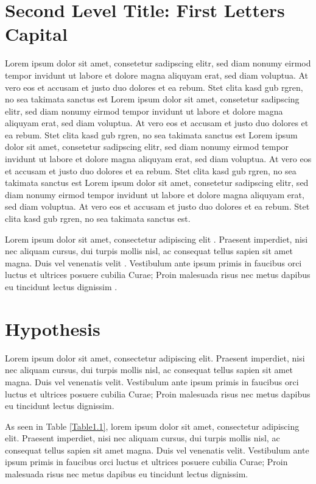 \section{Second Level Title: First Letters Capital}\label{literaturereview}

Lorem ipsum dolor sit amet, consetetur sadipscing elitr, sed diam nonumy eirmod tempor invidunt ut labore et dolore magna aliquyam erat, sed diam voluptua. At vero eos et accusam et justo duo dolores et ea rebum. Stet clita kasd gub rgren, no sea takimata sanctus est Lorem ipsum dolor sit amet, consetetur sadipscing elitr, sed diam nonumy eirmod tempor invidunt ut labore et dolore magna aliquyam erat, sed diam voluptua. At vero eos et accusam et justo duo dolores et ea rebum. Stet clita kasd gub rgren, no sea takimata sanctus est Lorem ipsum dolor sit amet, consetetur sadipscing elitr, sed diam nonumy eirmod tempor invidunt ut labore et dolore magna aliquyam erat, sed diam voluptua. At vero eos et accusam et justo duo dolores et ea rebum. Stet clita kasd gub rgren, no sea takimata sanctus est Lorem ipsum dolor sit amet, consetetur sadipscing elitr, sed diam nonumy eirmod tempor invidunt ut labore et dolore magna aliquyam erat, sed diam voluptua. At vero eos et accusam et justo duo dolores et ea rebum. Stet clita kasd gub rgren, no sea takimata sanctus est.

Lorem ipsum dolor sit amet, consectetur adipiscing elit \cite{HYP:HYP57}. Praesent imperdiet, nisi nec aliquam cursus, dui turpis mollis nisl, ac consequat tellus sapien sit amet magna. Duis vel venenatis velit \cite{Box:1990:TSA:574978}. Vestibulum ante ipsum primis in faucibus orci luctus et ultrices posuere cubilia Curae; Proin malesuada risus nec metus dapibus eu tincidunt lectus dignissim \cite{17590413}. 

\section{Hypothesis}

Lorem ipsum dolor sit amet, consectetur adipiscing elit. Praesent imperdiet, nisi nec aliquam cursus, dui turpis mollis nisl, ac consequat tellus sapien sit amet magna. Duis vel venenatis velit. Vestibulum ante ipsum primis in faucibus orci luctus et ultrices posuere cubilia Curae; Proin malesuada risus nec metus dapibus eu tincidunt lectus dignissim. 

As seen in Table \ref{Table1.1}, lorem ipsum dolor sit amet, consectetur adipiscing elit. Praesent imperdiet, nisi nec aliquam cursus, dui turpis mollis nisl, ac consequat tellus sapien sit amet magna. Duis vel venenatis velit. Vestibulum ante ipsum primis in faucibus orci luctus et ultrices posuere cubilia Curae; Proin malesuada risus nec metus dapibus eu tincidunt lectus dignissim. 

